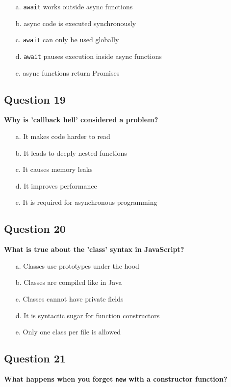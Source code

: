 \documentclass{article}
\begin{document}
\begin{itemize}
  \item[a.] \texttt{await} works outside async functions
  \item[b.] async code is executed synchronously
  \item[c.] \texttt{await} can only be used globally
  \item[d.] \texttt{await} pauses execution inside async functions
  \item[e.] async functions return Promises
\end{itemize}

\subsection*{Question 19}
\textbf{Why is 'callback hell' considered a problem?}

\begin{itemize}
  \item[a.] It makes code harder to read
  \item[b.] It leads to deeply nested functions
  \item[c.] It causes memory leaks
  \item[d.] It improves performance
  \item[e.] It is required for asynchronous programming
\end{itemize}

\subsection*{Question 20}
\textbf{What is true about the 'class' syntax in JavaScript?}

\begin{itemize}
  \item[a.] Classes use prototypes under the hood
  \item[b.] Classes are compiled like in Java
  \item[c.] Classes cannot have private fields
  \item[d.] It is syntactic sugar for function constructors
  \item[e.] Only one class per file is allowed
\end{itemize}

\subsection*{Question 21}
\textbf{What happens when you forget \texttt{new} with a constructor function?}
\end{document}
